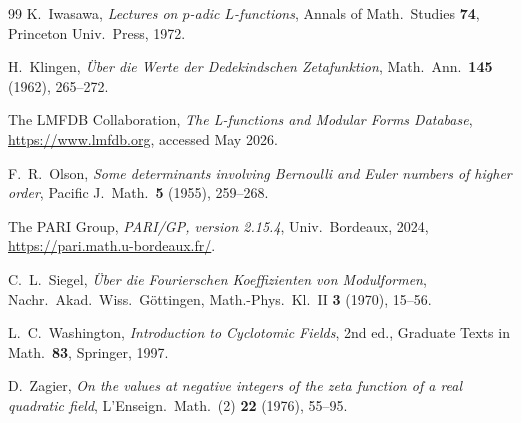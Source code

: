 \documentclass[11pt,reqno]{amsart}
\theoremstyle{plain}
\theoremstyle{definition}
\begin{document}
\begin{thebibliography}{99}
 K.~Iwasawa, \emph{Lectures on $p$-adic
$L$-functions}, Annals of Math.\ Studies \textbf{74}, Princeton Univ.\
Press, 1972.

 H.~Klingen, \emph{\"Uber die Werte der Dedekindschen
Zetafunktion}, Math.\ Ann.\ \textbf{145} (1962), 265--272.

 The LMFDB Collaboration, \emph{The L-functions and
Modular Forms Database}, \url{https://www.lmfdb.org}, accessed May
2026.

 F.~R.~Olson, \emph{Some determinants involving
Bernoulli and Euler numbers of higher order}, Pacific J.\ Math.\
\textbf{5} (1955), 259--268.

 The PARI Group, \emph{PARI/GP, version 2.15.4},
Univ.\ Bordeaux, 2024, \url{https://pari.math.u-bordeaux.fr/}.

 C.~L.~Siegel, \emph{\"Uber die Fourierschen
Koeffizienten von Modulformen}, Nachr.\ Akad.\ Wiss.\ G\"ottingen,
Math.-Phys.\ Kl.\ II \textbf{3} (1970), 15--56.

 L.~C.~Washington, \emph{Introduction to
Cyclotomic Fields}, 2nd ed., Graduate Texts in Math.\ \textbf{83},
Springer, 1997.

 D.~Zagier, \emph{On the values at negative
integers of the zeta function of a real quadratic field},
L'Enseign.\ Math.\ (2) \textbf{22} (1976), 55--95.

\end{thebibliography}
\end{document}
